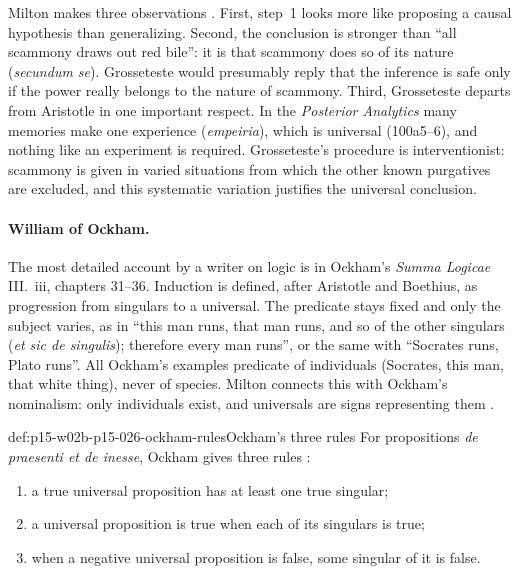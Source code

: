 Milton makes three observations \cite[pp.~17--18]{Milton2011InductionBeforeHume}.
First, step~1 looks more like proposing a causal hypothesis than
generalizing. Second, the conclusion is stronger than ``all scammony draws
out red bile'': it is that scammony does so of its nature (\emph{secundum
se}). Grosseteste would presumably reply that the inference is safe only
if the power really belongs to the nature of scammony. Third, Grosseteste
departs from Aristotle in one important respect. In the \emph{Posterior
Analytics} many memories make one experience (\emph{empeiria}), which is
universal (100a5--6), and nothing like an experiment is required.
Grosseteste's procedure is interventionist: scammony is given in varied
situations from which the other known purgatives are excluded, and this
systematic variation justifies the universal conclusion.

\paragraph{William of Ockham.}
The most detailed account by a writer on logic is in Ockham's \emph{Summa
Logicae} III.~iii, chapters 31--36. Induction is defined, after Aristotle
and Boethius, as progression from singulars to a universal. The predicate
stays fixed and only the subject varies, as in ``this man runs, that man
runs, and so of the other singulars (\emph{et sic de singulis}); therefore
every man runs'', or the same with ``Socrates runs, Plato runs''. All
Ockham's examples predicate of individuals (Socrates, this man, that white
thing), never of species. Milton connects this with Ockham's nominalism:
only individuals exist, and universals are signs representing them
\cite[p.~18]{Milton2011InductionBeforeHume}.

\begin{hbdefinition}{def:p15-w02b-p15-026-ockham-rules}{Ockham's three rules}
For propositions \emph{de praesenti et de inesse}, Ockham gives three
rules \cite[p.~18]{Milton2011InductionBeforeHume}:
\begin{enumerate}
\item a true universal proposition has at least one true singular;
\item a universal proposition is true when each of its singulars is
  true;
\item when a negative universal proposition is false, some singular of
  it is false.
\end{enumerate}
\end{hbdefinition}

